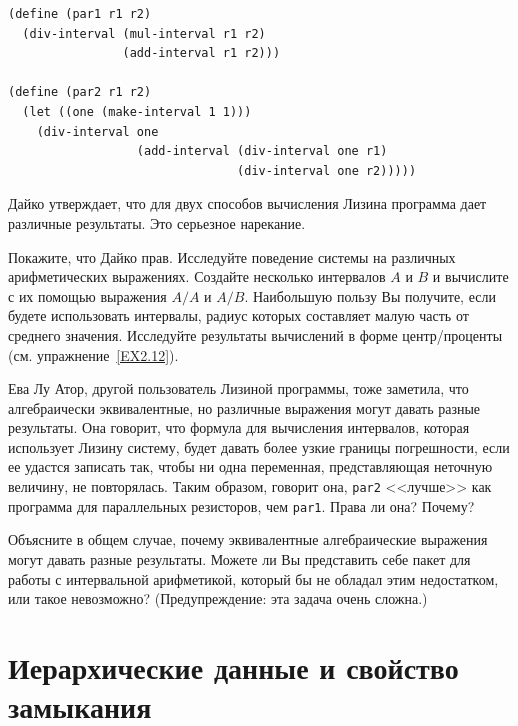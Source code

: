\begin{Verbatim}[fontsize=\small]
(define (par1 r1 r2)
  (div-interval (mul-interval r1 r2)
                (add-interval r1 r2)))

(define (par2 r1 r2)
  (let ((one (make-interval 1 1))) 
    (div-interval one
                  (add-interval (div-interval one r1)
                                (div-interval one r2)))))
\end{Verbatim}
Дайко утверждает, что для двух способов вычисления Лизина программа
дает различные результаты.  Это серьезное нарекание.
\begin{exercise}{2.14}\label{EX2.14}%
Покажите, что Дайко прав.  Исследуйте поведение системы на
различных арифметических выражениях.  Создайте несколько интервалов
$A$ и $B$ и вычислите с их помощью выражения
$A/A$ и $A/B$.  Наибольшую пользу Вы получите,
если будете использовать интервалы, радиус которых составляет малую
часть от среднего значения.  Исследуйте результаты вычислений в форме
центр/проценты (см. упражнение~\ref{EX2.12}).
\end{exercise}
\begin{exercise}{2.15}\label{EX2.15}%
Ева Лу Атор, другой пользователь Лизиной программы, тоже заметила, что
алгебраически эквивалентные, но различные выражения могут давать
разные результаты.  Она говорит, что формула для вычисления интервалов, 
которая использует Лизину систему, будет давать более узкие границы
погрешности, если ее удастся записать так, чтобы ни одна переменная,
представляющая неточную величину, не повторялась.  Таким образом,
говорит она, {\tt par2} <<лучше>> как программа для
параллельных резисторов, чем {\tt par1}.  Права ли она? Почему?
\end{exercise}
\begin{exercise}{2.16}\label{EX2.16}%
Объясните в общем случае, почему эквивалентные
алгебраические выражения могут давать разные результаты.  Можете ли Вы 
представить себе пакет для работы с интервальной арифметикой, который
бы не обладал этим недостатком, или такое невозможно?
(Предупреждение: эта задача очень сложна.)
\end{exercise}

\section{Иерархические данные и свойство замыкания}
\label{HIERARCHICAL-DATA-AND-THE-CLOSURE-PROPERTY}


